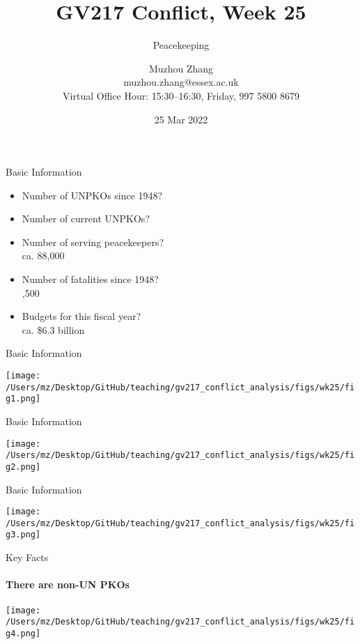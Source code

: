 \documentclass[handout]{beamer}
\title{GV217 Conflict, Week 25}
\subtitle{Peacekeeping}
\author{Muzhou Zhang\\ muzhou.zhang@essex.ac.uk\\ Virtual Office Hour: 15:30--16:30, Friday, 997 5800 8679}
\date{25 Mar 2022}
\begin{document}
\maketitle
{}

\begin{frame}{Basic Information}
    \begin{itemize}
        \pause\item Number of UNPKOs since 1948?\\
        \pause\item Number of current UNPKOs?\\
        \pause\item Number of serving peacekeepers?\\
        \pause      ca. 88,000
        \pause\item Number of fatalities since 1948?\\
        ,500
        \pause\item Budgets for this fiscal year?\\
        \pause      ca. \$6.3 billion
    \end{itemize}
\end{frame}

\begin{frame}{Basic Information}
    \pause
    \begin{center}
        \texttt{[image: /Users/mz/Desktop/GitHub/teaching/gv217\_conflict\_analysis/figs/wk25/fig1.png]}
    \end{center}
\end{frame}

\begin{frame}{Basic Information}
    \pause
    \begin{center}
        \texttt{[image: /Users/mz/Desktop/GitHub/teaching/gv217\_conflict\_analysis/figs/wk25/fig2.png]}
    \end{center}
\end{frame}

\begin{frame}{Basic Information}
    \pause
    \begin{center}
        \texttt{[image: /Users/mz/Desktop/GitHub/teaching/gv217\_conflict\_analysis/figs/wk25/fig3.png]}
    \end{center}
\end{frame}

\begin{frame}{Key Facts}
\framesubtitle{There are non-UN PKOs}
    \pause
    \begin{center}
        \texttt{[image: /Users/mz/Desktop/GitHub/teaching/gv217\_conflict\_analysis/figs/wk25/fig4.png]}
    \end{center}
\end{frame}
\end{document}
